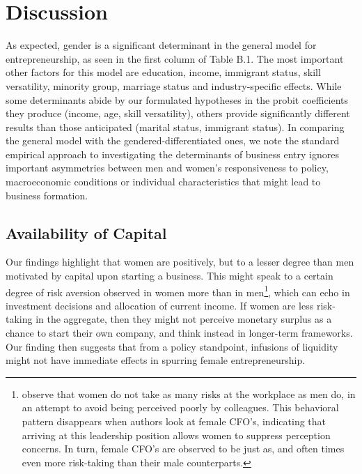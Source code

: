 \chapter{Discussion\label{ch:disc}}

As expected, gender is a significant determinant in the general model for entrepreneurship, as seen in the first column of Table B.1. The most important other factors for this model are education, income, immigrant status, skill versatility, minority group, marriage status and industry-specific effects. While some determinants abide by our formulated hypotheses in the probit coefficients they produce (income, age, skill versatility), others provide significantly different results than those anticipated (marital status, immigrant status). In comparing the general model with the gendered-differentiated ones, we note the standard empirical approach to investigating the determinants of business entry ignores important asymmetries between men and women's responsiveness to policy, macroeconomic conditions or individual characteristics that might lead to business formation. 

\section{Availability of Capital}
Our findings highlight that women are positively, but to a lesser degree than men motivated by capital upon starting a business. This might speak to a certain degree of risk aversion observed in women more than in men\footnote{\cite{adams2012beyond} observe that women do not take as many risks at the workplace as men do, in an attempt to avoid being perceived poorly by colleagues. This behavioral pattern disappears when authors look at female CFO's, indicating that arriving at this leadership position allows women to suppress perception concerns. In turn, female CFO's are observed to be just as, and often times even more risk-taking than their male counterparts.}, which can echo in investment decisions and allocation of current income. If women are less risk-taking in the aggregate, then they might not perceive monetary surplus as a chance to start their own company, and think instead in longer-term frameworks. Our finding then suggests that from a policy standpoint, infusions of liquidity might not have immediate effects in spurring female entrepreneurship. 

